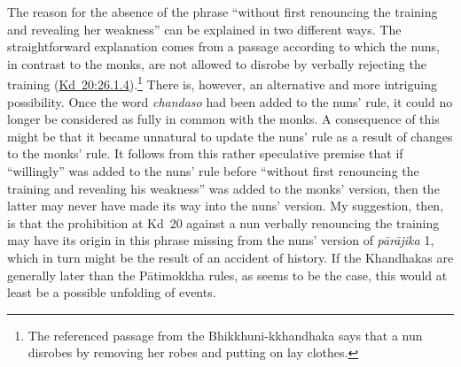 \documentclass[12pt,openany]{book}%
\begin{document}
The reason for the absence of the phrase “without first renouncing the training and revealing her weakness” can be explained in two different ways. The straightforward explanation comes from a passage according to which the nuns, in contrast to the monks, are not allowed to disrobe by verbally rejecting the training (\href{https://suttacentral.net/pli-tv-kd20/en/brahmali\#26.1.4}{Kd~20:26.1.4}).\footnote{The referenced passage from the Bhikkhuni-kkhandhaka says that a nun disrobes by removing her robes and putting on lay clothes. } There is, however, an alternative and more intriguing possibility. Once the word \textit{chandaso} had been added to the nuns’ rule, it could no longer be considered as fully in common with the monks. A consequence of this might be that it became unnatural to update the nuns’ rule as a result of changes to the monks’ rule. It follows from this rather speculative premise that if “willingly” was added to the nuns’ rule before “without first renouncing the training and revealing his weakness” was added to the monks’ version, then the latter may never have made its way into the nuns’ version. My suggestion, then, is that the prohibition at Kd 20 against a nun verbally renouncing the training may have its origin in this phrase missing from the nuns’ version of \textit{\textsanskrit{pārājika}} 1, which in turn might be the result of an accident of history. If the Khandhakas are generally later than the \textsanskrit{Pātimokkha} rules, as seems to be the case, this would at least be a possible unfolding of events.
\end{document}
